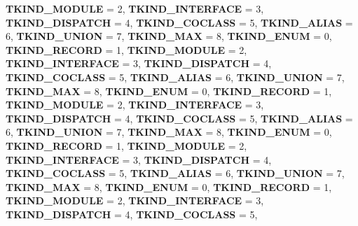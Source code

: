 \begin{DoxyCompactItemize}
{\bfseries T\+K\+I\+N\+D\+\_\+\+M\+O\+D\+U\+LE} = 2, 
{\bfseries T\+K\+I\+N\+D\+\_\+\+I\+N\+T\+E\+R\+F\+A\+CE} = 3, 
\newline
{\bfseries T\+K\+I\+N\+D\+\_\+\+D\+I\+S\+P\+A\+T\+CH} = 4, 
{\bfseries T\+K\+I\+N\+D\+\_\+\+C\+O\+C\+L\+A\+SS} = 5, 
{\bfseries T\+K\+I\+N\+D\+\_\+\+A\+L\+I\+AS} = 6, 
{\bfseries T\+K\+I\+N\+D\+\_\+\+U\+N\+I\+ON} = 7, 
\newline
{\bfseries T\+K\+I\+N\+D\+\_\+\+M\+AX} = 8, 
{\bfseries T\+K\+I\+N\+D\+\_\+\+E\+N\+UM} = 0, 
{\bfseries T\+K\+I\+N\+D\+\_\+\+R\+E\+C\+O\+RD} = 1, 
{\bfseries T\+K\+I\+N\+D\+\_\+\+M\+O\+D\+U\+LE} = 2, 
\newline
{\bfseries T\+K\+I\+N\+D\+\_\+\+I\+N\+T\+E\+R\+F\+A\+CE} = 3, 
{\bfseries T\+K\+I\+N\+D\+\_\+\+D\+I\+S\+P\+A\+T\+CH} = 4, 
{\bfseries T\+K\+I\+N\+D\+\_\+\+C\+O\+C\+L\+A\+SS} = 5, 
{\bfseries T\+K\+I\+N\+D\+\_\+\+A\+L\+I\+AS} = 6, 
\newline
{\bfseries T\+K\+I\+N\+D\+\_\+\+U\+N\+I\+ON} = 7, 
{\bfseries T\+K\+I\+N\+D\+\_\+\+M\+AX} = 8, 
{\bfseries T\+K\+I\+N\+D\+\_\+\+E\+N\+UM} = 0, 
{\bfseries T\+K\+I\+N\+D\+\_\+\+R\+E\+C\+O\+RD} = 1, 
\newline
{\bfseries T\+K\+I\+N\+D\+\_\+\+M\+O\+D\+U\+LE} = 2, 
{\bfseries T\+K\+I\+N\+D\+\_\+\+I\+N\+T\+E\+R\+F\+A\+CE} = 3, 
{\bfseries T\+K\+I\+N\+D\+\_\+\+D\+I\+S\+P\+A\+T\+CH} = 4, 
{\bfseries T\+K\+I\+N\+D\+\_\+\+C\+O\+C\+L\+A\+SS} = 5, 
\newline
{\bfseries T\+K\+I\+N\+D\+\_\+\+A\+L\+I\+AS} = 6, 
{\bfseries T\+K\+I\+N\+D\+\_\+\+U\+N\+I\+ON} = 7, 
{\bfseries T\+K\+I\+N\+D\+\_\+\+M\+AX} = 8, 
{\bfseries T\+K\+I\+N\+D\+\_\+\+E\+N\+UM} = 0, 
\newline
{\bfseries T\+K\+I\+N\+D\+\_\+\+R\+E\+C\+O\+RD} = 1, 
{\bfseries T\+K\+I\+N\+D\+\_\+\+M\+O\+D\+U\+LE} = 2, 
{\bfseries T\+K\+I\+N\+D\+\_\+\+I\+N\+T\+E\+R\+F\+A\+CE} = 3, 
{\bfseries T\+K\+I\+N\+D\+\_\+\+D\+I\+S\+P\+A\+T\+CH} = 4, 
\newline
{\bfseries T\+K\+I\+N\+D\+\_\+\+C\+O\+C\+L\+A\+SS} = 5, 
{\bfseries T\+K\+I\+N\+D\+\_\+\+A\+L\+I\+AS} = 6, 
{\bfseries T\+K\+I\+N\+D\+\_\+\+U\+N\+I\+ON} = 7, 
{\bfseries T\+K\+I\+N\+D\+\_\+\+M\+AX} = 8, 
\newline
{\bfseries T\+K\+I\+N\+D\+\_\+\+E\+N\+UM} = 0, 
{\bfseries T\+K\+I\+N\+D\+\_\+\+R\+E\+C\+O\+RD} = 1, 
{\bfseries T\+K\+I\+N\+D\+\_\+\+M\+O\+D\+U\+LE} = 2, 
{\bfseries T\+K\+I\+N\+D\+\_\+\+I\+N\+T\+E\+R\+F\+A\+CE} = 3, 
\newline
{\bfseries T\+K\+I\+N\+D\+\_\+\+D\+I\+S\+P\+A\+T\+CH} = 4, 
{\bfseries T\+K\+I\+N\+D\+\_\+\+C\+O\+C\+L\+A\+SS} = 5, 

\end{DoxyCompactItemize}
